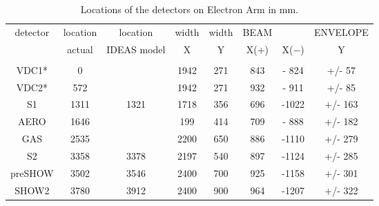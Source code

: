 \begin{table}[hptb]
\begin{center}
\begin{tabular}{cccccccc}
detector&location&  location& width &   width &      BEAM  &        & ENVELOPE \\
        & actual &IDEAS model&   X  &     Y   &      X(+)&  X($-$) &   Y\\  \hline
       &        &          &        &         &          &         &           \\  \hline    
VDC1*   &      0 &          &   1942 &    271  &     843    & - 824  & +/-  57  \\
VDC2*   &     572&          &   1942 &    271  &     932    & - 911  & +/-  85  \\
S1      &    1311&     1321 &   1718 &    356  &     696    & -1022  & +/- 163  \\ 
AERO    &    1646&          &   199  &    414  &     709    & - 888  & +/- 182  \\
GAS     &    2535&          &   2200 &    650  &     886    & -1110  & +/- 279  \\ 
S2      &    3358&     3378 &   2197 &    540  &     897    & -1124  & +/- 285  \\
preSHOW &    3502&     3546 &   2400 &    700  &     925    & -1158  & +/- 301  \\ 
SHOW2   &    3780&     3912 &   2400 &    900  &     964    & -1207  & +/- 322  \\  \hline
\end{tabular}
\end{center}
\caption[Detectors: Electron ARM Detector Locations]{Locations of
the detectors on Electron Arm in mm.}
\label{ta:Edetg}
\end{table}

